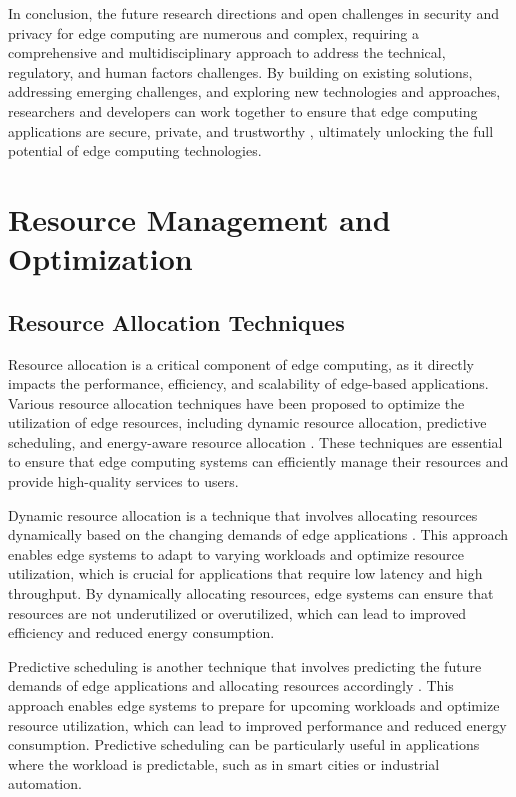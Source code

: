 \documentclass[11pt]{article}
\begin{document}
In conclusion, the future research directions and open challenges in security and privacy for edge computing are numerous and complex, requiring a comprehensive and multidisciplinary approach to address the technical, regulatory, and human factors challenges. By building on existing solutions, addressing emerging challenges, and exploring new technologies and approaches, researchers and developers can work together to ensure that edge computing applications are secure, private, and trustworthy \cite{ref116}, ultimately unlocking the full potential of edge computing technologies.

\section{Resource Management and Optimization}

\subsection{Resource Allocation Techniques}

Resource allocation is a critical component of edge computing, as it directly impacts the performance, efficiency, and scalability of edge-based applications. Various resource allocation techniques have been proposed to optimize the utilization of edge resources, including dynamic resource allocation, predictive scheduling, and energy-aware resource allocation \cite{ref117}. These techniques are essential to ensure that edge computing systems can efficiently manage their resources and provide high-quality services to users.

Dynamic resource allocation is a technique that involves allocating resources dynamically based on the changing demands of edge applications \cite{ref118}. This approach enables edge systems to adapt to varying workloads and optimize resource utilization, which is crucial for applications that require low latency and high throughput. By dynamically allocating resources, edge systems can ensure that resources are not underutilized or overutilized, which can lead to improved efficiency and reduced energy consumption.

Predictive scheduling is another technique that involves predicting the future demands of edge applications and allocating resources accordingly \cite{ref119}. This approach enables edge systems to prepare for upcoming workloads and optimize resource utilization, which can lead to improved performance and reduced energy consumption. Predictive scheduling can be particularly useful in applications where the workload is predictable, such as in smart cities or industrial automation.
\end{document}
